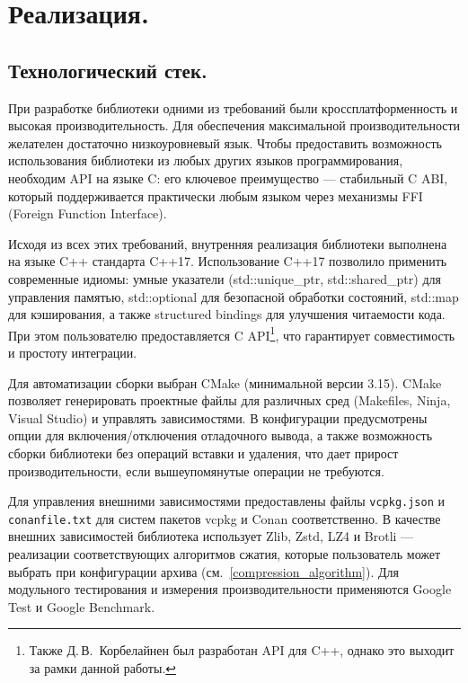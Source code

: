 \section{Реализация.} \label{implementation}

\subsection{Технологический стек.}

При разработке библиотеки одними из требований были кроссплатформенность и высокая производительность. Для обеспечения максимальной производительности желателен достаточно низкоуровневый язык. Чтобы предоставить возможность использования библиотеки из любых других языков программирования, необходим API на языке C: его ключевое преимущество --- стабильный C ABI, который поддерживается практически любым языком через механизмы FFI (Foreign Function Interface). 

Исходя из всех этих требований, внутренняя реализация библиотеки выполнена на языке C++ стандарта C++17. Использование C++17 позволило применить современные идиомы: умные указатели (std::unique\_ptr, std::shared\_ptr) для управления памятью, std::optional для безопасной обработки состояний, std::map для кэширования, а также structured bindings для улучшения читаемости кода. При этом пользователю предоставляется C API\footnote{Также Д.\,В.~Корбелайнен был разработан API для C++, однако это выходит за рамки данной работы.}, что гарантирует совместимость и простоту интеграции.

Для автоматизации сборки выбран CMake (минимальной версии 3.15). CMake позволяет генерировать проектные файлы для различных сред (Makefiles, Ninja, Visual Studio) и управлять зависимостями. В конфигурации предусмотрены опции для включения/отключения отладочного вывода, а также возможность сборки библиотеки без операций вставки и удаления, что дает прирост производительности, если вышеупомянутые операции не требуются.

Для управления внешними зависимостями предоставлены файлы \texttt{vcpkg.json} и \texttt{conanfile.txt} для систем пакетов vcpkg и Conan соответственно. В качестве внешних зависимостей библиотека использует Zlib\cite{zlib_website}, Zstd\cite{zstd_github}, LZ4\cite{lz4_github} и Brotli\cite{brotli_github} --- реализации соответствующих алгоритмов сжатия, которые пользователь может выбрать при конфигурации архива (см.~\ref{compression_algorithm}). Для модульного тестирования и измерения производительности применяются Google Test\cite{googletest} и Google Benchmark\cite{google_benchmark}.

